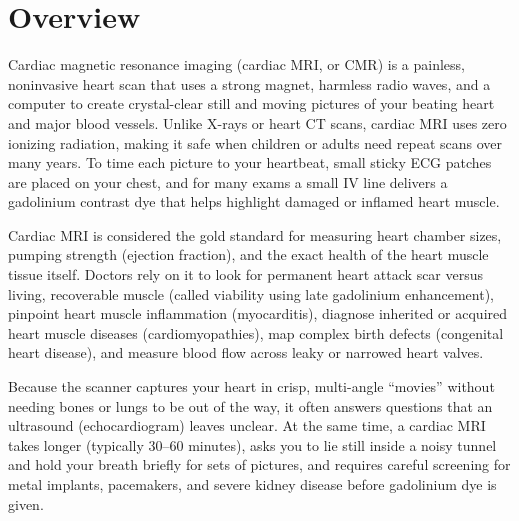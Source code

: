 \label{ch:infographic-cardiac-mri}

\section{Overview}

Cardiac magnetic resonance imaging (cardiac MRI, or CMR) is a painless, noninvasive heart scan that uses a strong magnet, harmless radio waves, and a computer to create crystal-clear still and moving pictures of your beating heart and major blood vessels. Unlike X-rays or heart CT scans, cardiac MRI uses zero ionizing radiation, making it safe when children or adults need repeat scans over many years. To time each picture to your heartbeat, small sticky ECG patches are placed on your chest, and for many exams a small IV line delivers a gadolinium contrast dye that helps highlight damaged or inflamed heart muscle.

Cardiac MRI is considered the gold standard for measuring heart chamber sizes, pumping strength (ejection fraction), and the exact health of the heart muscle tissue itself. Doctors rely on it to look for permanent heart attack scar versus living, recoverable muscle (called viability using late gadolinium enhancement), pinpoint heart muscle inflammation (myocarditis), diagnose inherited or acquired heart muscle diseases (cardiomyopathies), map complex birth defects (congenital heart disease), and measure blood flow across leaky or narrowed heart valves.

Because the scanner captures your heart in crisp, multi-angle ``movies'' without needing bones or lungs to be out of the way, it often answers questions that an ultrasound (echocardiogram) leaves unclear. At the same time, a cardiac MRI takes longer (typically 30--60 minutes), asks you to lie still inside a noisy tunnel and hold your breath briefly for sets of pictures, and requires careful screening for metal implants, pacemakers, and severe kidney disease before gadolinium dye is given.

